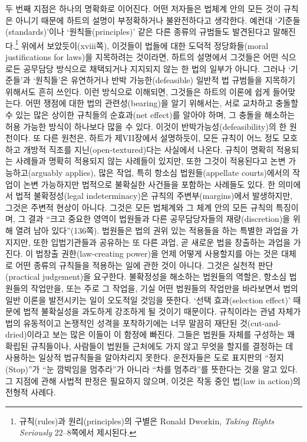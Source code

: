 두 번째 지점은 하나의 명확화로 이어진다. 어떤 저자들은 법체계 안의 모든
것이 규칙은 아니기 때문에 하트의 설명이 부정확하거나 불완전하다고
생각한다. 예컨대 ‘기준들(standards)’이나 ‘원칙들(principles)’ 같은 다른
종류의 규범들도 발견된다고 말해진다.\footnote{규칙(rules)과
  원리(principles)의 구별은 Ronald Dworkin, \emph{Taking Rights
  Seriously} 22--8쪽에서 제시된다.} 위에서 보았듯이(xviii쪽), 이것들이
법들에 대한 도덕적 정당화들(moral justifications for laws)을 지목하려는
것이라면, 하트의 설명에서 그것들은 어떤 식으로든 공무담당 방식으로
채택되거나 지지되지 않는 한 법의 일부가 아니다. 그러나 ‘기준들’과
‘원칙들’은 유연하거나 반박 가능한(defeasible) 일반적 법 규범들을
지목하기 위해서도 흔히 쓰인다. 이런 방식으로 이해되면, 그것들은 하트의
이론에 쉽게 들어맞는다. 어떤 쟁점에 대한 법의 관련성(bearing)을 알기
위해서는, 서로 교차하고 충돌할 수 있는 많은 상이한 규칙들의 순효과(net
effect)를 알아야 하며, 그 충돌을 해소하는 허용 가능한 방식이 하나보다
많을 수 있다. 이것이 반박가능성(defeasibility)의 한 원천이다. 또 다른
원천은, 하트가 제VII장에서 설명하듯이, 모든 규칙이 어느 정도 모호하고
개방적 직조를 지닌(open-textured)다는 사실에서 나온다. 규칙이 명확히
적용되는 사례들과 명확히 적용되지 않는 사례들이 있지만, 또한 그것이
적용된다고 논변 가능하고(arguably applies), 많은 작업, 특히 항소심
법원들(appellate courts)에서의 작업이 논변 가능하지만 법적으로 불확실한
사건들을 포함하는 사례들도 있다. 한 의미에서 법적 불확정성(legal
indeterminacy)은 규칙의 주변부(margins)에서 발생하지만, 그것은 주변적
현상이 아니다. 그것은 모든 법체계와 그 체계 안의 모든 규칙의 특징이며,
그 결과 “크고 중요한 영역이 법원들과 다른 공무담당자들의
재량(discretion)을 위해 열려 남아 있다”(136쪽). 법원들은 법의 권위 있는
적용들을 하는 특별한 과업을 가지지만, 또한 입법기관들과 공유하는 또 다른
과업, 곧 새로운 법을 창출하는 과업을 가진다. 이 법창출 권한(law-creating
power)을 언제 어떻게 사용할지를 아는 것은 대체로 어떤 종류의 규칙들을
적용하는 일에 관한 것이 아니다. 그것은 실천적 판단(practical
judgement)을 요구한다. 불확정성을 해소하는 법원들의 역할은, 항소심
법원들의 작업만을, 또는 주로 그 작업을, 기실 어떤 법원들의 작업만을
바라보면서 법의 일반 이론을 발전시키는 일이 오도적일 것임을 뜻한다.
‘선택 효과(selection effect)’ 때문에 법적 불확실성을 과도하게 강조하게
될 것이기 때문이다. 규칙이라는 관념 자체가 법의 유동적이고 논쟁적인
성격을 포착하기에는 너무 말끔히 재단된 것(cut-and-dried)이라고 보는 많은
이들이 이 함정에 빠진다. 그들은 법원들 자체를 구성하는 꽤 확립된
규칙들이나, 사람들이 법원들 근처에도 가지 않고 무엇을 할지를 결정하는 데
사용하는 일상적 법규칙들을 알아차리지 못한다. 운전자들은 도로 표지판의
“정지(Stop)”가 “눈 깜박임을 멈추라”가 아니라 “차를 멈추라”를
뜻한다는 것을 알고 있다. 그 지점에 관해 사법적 판정은 필요하지 않으며,
이것은 작동 중인 법(law in action)의 전형적 사례다.

